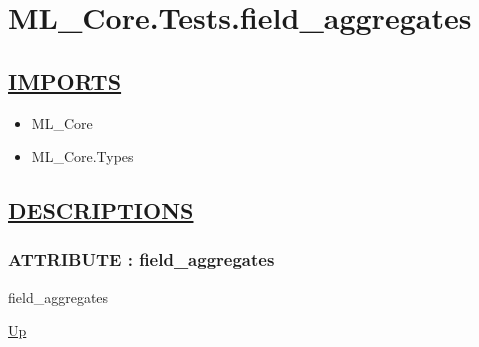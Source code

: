 \chapter*{ML\_Core.Tests.field\_aggregates}
\hypertarget{ecldoc:toc:ML_Core.Tests.field_aggregates}{}

\section*{\underline{IMPORTS}}
\begin{itemize}
\item ML\_Core
\item ML\_Core.Types
\end{itemize}

\section*{\underline{DESCRIPTIONS}}
\subsection*{ATTRIBUTE : field\_aggregates}
\hypertarget{ecldoc:ml_core.tests.field_aggregates}{}
\begin{minipage}[t]{\textwidth}
\begin{flushleft}
 field\_aggregates 
\end{flushleft}
\end{minipage}
\hyperlink{ecldoc:toc:ML_Core/Tests}{Up}

\par
\par
